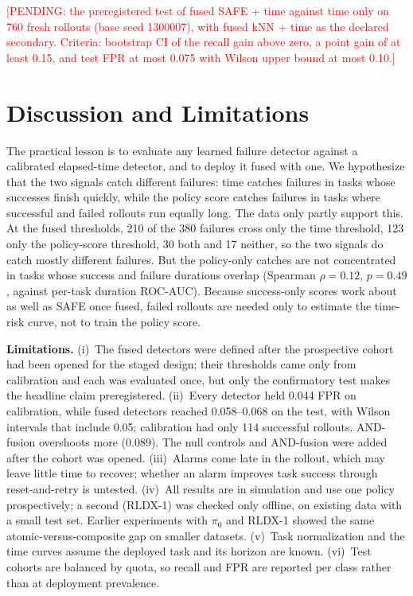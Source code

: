 \documentclass[conference,a4paper]{IEEEtran}
\newcommand{\pending}[1]{\textcolor{red}{[PENDING: #1]}}
\begin{document}
\pending{the preregistered test of fused SAFE + time against time only on 760 fresh rollouts
(base seed 1300007), with fused kNN + time as the declared secondary. Criteria: bootstrap CI
of the recall gain above zero, a point gain of at least 0.15, and test FPR at most 0.075
with Wilson upper bound at most 0.10.}

\section{Discussion and Limitations}

The practical lesson is to evaluate any learned failure detector against a calibrated
elapsed-time detector, and to deploy it fused with one. We hypothesize that the two signals
catch different failures: time catches failures in tasks whose successes finish quickly,
while the policy score catches failures in tasks where successful and failed rollouts run
equally long. The data only partly support this. At the fused thresholds, 210 of the 380
failures cross only the time threshold, 123 only the policy-score threshold, 30 both and 17
neither, so the two signals do catch mostly different failures. But the policy-only catches
are not concentrated in tasks whose success and failure durations overlap (Spearman
$\rho = 0.12$, $p = 0.49$, against per-task duration ROC-AUC). Because success-only scores work about as well as SAFE once fused, failed
rollouts are needed only to estimate the time-risk curve, not to train the policy score.

\textbf{Limitations.} (i)~The fused detectors were defined after the prospective cohort had
been opened for the staged design; their thresholds came only from calibration and each was
evaluated once, but only the confirmatory test makes the headline claim preregistered.
(ii)~Every detector held 0.044 FPR on calibration, while fused detectors reached 0.058--0.068
on the test, with Wilson intervals that include 0.05; calibration had only 114 successful
rollouts. AND-fusion overshoots more (0.089). The null controls and AND-fusion were added
after the cohort was opened. (iii)~Alarms come late in the rollout, which may leave little time to recover; whether an
alarm improves task success through reset-and-retry is untested.
(iv)~All results are in simulation and use one policy prospectively; a second (RLDX-1) was
checked only offline, on existing data with a small test set. Earlier experiments with
$\pi_0$ and RLDX-1 showed the same atomic-versus-composite gap on smaller datasets. (v)~Task normalization and
the time curves assume the deployed task and its horizon are known. (vi)~Test cohorts are
balanced by quota, so recall and FPR are reported per class rather than at deployment
prevalence.
\end{document}
